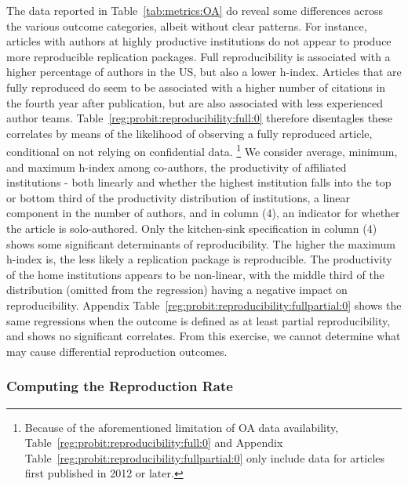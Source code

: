 

The data reported in Table~\ref{tab:metrics:OA} do  reveal  some differences across the various outcome categories, albeit without clear patterns. For instance, articles with authors at highly productive institutions do not appear to produce more reproducible replication packages. Full reproducibility is associated with a higher percentage of authors in the US, but also a lower h-index. Articles that are fully reproduced do seem to be associated with a higher number of citations in the fourth year after publication, but are also associated with less experienced author teams. Table~\ref{reg:probit:reproducibility:full:0} therefore disentagles these correlates by means of the likelihood of observing a fully reproduced article, conditional on not relying on confidential data.%
%
\footnote{Because of the aforementioned limitation of OA data availability, Table~\ref{reg:probit:reproducibility:full:0} and Appendix Table~\ref{reg:probit:reproducibility:fullpartial:0} only include data for articles first published in 2012 or later.}
%
We consider average, minimum, and maximum h-index among co-authors, the productivity of affiliated institutions - both linearly and whether the highest institution falls into the top or bottom third of the productivity distribution of institutions, a linear component in the number of authors, and in column (4), an indicator for whether the article is solo-authored. Only the kitchen-sink specification in column (4) shows some significant determinants of reproducibility. The higher the maximum h-index is, the less likely a replication package is reproducible. The productivity of the home institutions appears to be non-linear, with the middle third of the distribution (omitted from the regression) having a negative impact on reproducibility. Appendix Table~\ref{reg:probit:reproducibility:fullpartial:0} shows the same regressions when the outcome is defined as at least partial reproducibility, and shows no significant correlates. From this exercise, we cannot determine what may cause differential reproduction outcomes.




%



\subsubsection{Computing the Reproduction Rate}


